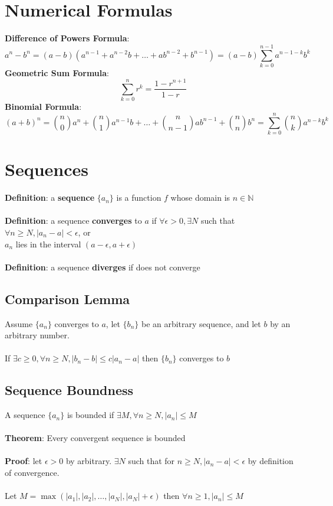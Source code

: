 \documentclass{article}
\begin{document}
  \section{Numerical Formulas}
  \textbf{Difference of Powers Formula}:
  \[a^n - b^n = (a-b)(a^{n-1} + a^{n-2}b + \ldots + ab^{n-2} + b^{n-1}) = (a-b)\sum_{k=0}^{n-1}a^{n-1-k}b^{k}\]
  \textbf{Geometric Sum Formula}:
  \[\sum_{k=0}^{n}r^k = \frac{1-r^{n+1}}{1-r}\]
  \textbf{Binomial Formula}:
  \[(a+b)^n = {n \choose 0}a^n + {n \choose 1}a^{n-1}b + \ldots + {n \choose n-1}ab^{n-1} + {n \choose n}b^n = \sum_{k=0}^{n} \binom{n}{k}a^{n-k}b^k\]
  \section{Sequences}
  \textbf{Definition}: a \textbf{sequence} $\{a_n\}$ is a function $f$ whose domain is $n \in \mathbb{N}$ \\ \\
  \textbf{Definition}: a sequence \textbf{converges} to $a$ if $\forall \epsilon > 0, \exists N$ such that $\forall n \geq N, |a_n - a| < \epsilon$, or \\ 
  $a_n$ lies in the interval $(a - \epsilon, a + \epsilon)$ \\ \\
  \textbf{Definition}: a sequence \textbf{diverges} if does not converge
  \subsection{Comparison Lemma}
  Assume $\{a_n\}$ converges to $a$, let $\{b_n\}$ be an arbitrary sequence, and let $b$ by an arbitrary number. \\ \\
  If $\exists c \geq 0, \forall n \geq N, |b_n - b| \leq c|a_n - a|$ then $\{b_n\}$ converges to $b$
  \subsection{Sequence Boundness}
  A sequence $\{a_n\}$ is bounded if $\exists M, \forall n \geq N, |a_n| \leq M$ \\ \\
  \textbf{Theorem}: Every convergent sequence is bounded \\ \\
  \textbf{Proof}: let $\epsilon > 0$ by arbitrary. $\exists N$ such that for $n \geq N, |a_n - a| < \epsilon$ by definition of convergence. \\ \\
  Let $M = \max(|a_1|, |a_2|, \ldots, |a_N|, |a_N| + \epsilon)$ then $\forall n \geq 1, |a_n| \leq M$
\end{document}
